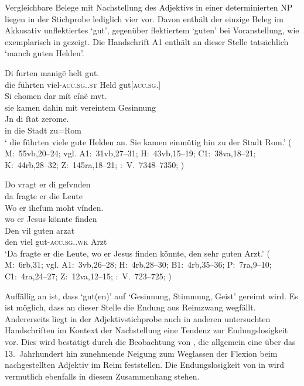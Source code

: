 Vergleichbare Belege mit Nachstellung des Adjektivs in einer determinierten NP
liegen in der Stichprobe lediglich vier vor. Davon enthält der einzige Beleg im
Akkusativ  unflektiertes  `gut', gegenüber
flektiertem  `guten' bei Voranstellung, wie exemplarisch in
 gezeigt. Die Handschrift A1 enthält an dieser
Stelle %
tatsächlich  `manch guten Helden'.

\begin{exe}
\ex \label{ex:maccadj}
	\begin{xlist}
	\ex \label{ex:maccadj_1}
		\gll Di furten manigẽ helt gut. \\
			die führten viel-\textsc{acc.sg.\MascM.st} Held
			gut[\textsc{acc.sg.\MascM}] \\
	\sn \gll Si chomen dar mít eínẽ mvt. \\
			sie kamen dahin mit vereintem Gesinnung \\
	\sn \gll Jn di ſtat zerome. \\
			in die Stadt zu=Rom \\
		\trans `\textelp{} die führten viele gute Helden an. Sie kamen einmütig
			hin zu der Stadt Rom.'
			(%
				M:~55vb,20--24; vgl.
				A1:~31vb,27--31;
				H:~43vb,15--19;
				C1:~38va,18--21;
				K:~44rb,28--32;
				Z:~145ra,18--21;
				\KC:~V.~7348--7350;
				\cite[216]{schroeder1895}%
			)

	\ex \label{ex:maccadj_2}
		\gll Do vragt er di geſvnden \\
			da fragte er die Leute \\
	\sn \gll Wo er iheſum moht vínden. \\
			wo er Jesus könnte finden \\
	\sn \gll Den vil guten arzat \\
			den viel gut-\textsc{acc.sg.\MascM.wk} Arzt \\
		\trans `Da fragte er die Leute, wo er Jesus finden
			könnte, den sehr guten Arzt.'
			(%
				M:~6rb,31; vgl.
				A1:~3vb,26--28;
				H:~4rb,28--30;
				B1:~4rb,35--36;
				P:~7ra,9--10;
				C1:~4ra,24--27;
				Z:~12va,12--15;
				\KC:~V.~723--725;
				\cite[94]{schroeder1895}%
			)
		\\
	\end{xlist}
\end{exe}

Auffällig an  ist, dass  `gut(en)' auf
 `Gesinnung, Stimmung, Geist' gereimt wird. Es ist möglich, dass an
dieser Stelle die Endung aus Reimzwang wegfällt. Andererseits liegt in der
Adjektivstichprobe auch in anderen untersuchten Handschriften im Kontext der
Nachstellung eine Tendenz zur Endungslosigkeit vor. Dies wird bestätigt durch
die Beobachtung von \citet[241]{ksw2}, die allgemein eine über das
13.~Jahrhundert hin zunehmende Neigung zum Weglassen der Flexion beim
nachgestellten Adjektiv im Reim feststellen. Die Endungslosigkeit von
 in  wird vermutlich ebenfalls in diesem
Zusammenhang stehen.


